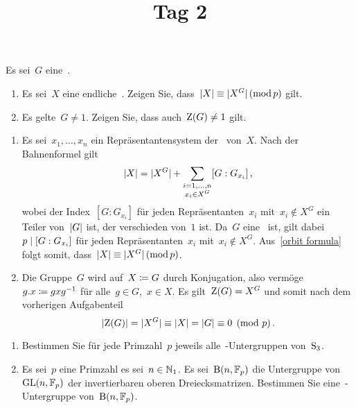 \documentclass{scrartcl}
\title{\vspace{-1em}Tag 2}
\author{}
\date{}
\begin{document}
\maketitle
\vspace{-7em}

\begin{exercise}
  Es sei~$G$ eine~.
  \begin{enumerate}
    \item
      Es sei~$X$ eine endliche~.
      Zeigen Sie, dass~$\lvert X\rvert \equiv \lvert X^G \rvert \,(\operatorname{mod} p)$ gilt.
    \item
      Es gelte~$G \neq 1$.
      Zeigen Sie, dass auch~$\operatorname{Z}(G) \neq 1$ gilt.
  \end{enumerate}
\end{exercise}

\begin{solution}
  \begin{enumerate}
    \item
      Es sei~$x_1, \dotsc, x_n$ ein Repräsentantensystem der~ von~$X$.
      Nach der Bahnenformel gilt
      \begin{equation}
        \label{orbit formula}
        \lvert X\rvert
        =
        \lvert X^ G \rvert
        +
        \sum_{\substack{ i = 1, \dotsc, n \\ x_i \in X^G }}
        [G : G_{x_i}] \,,
      \end{equation}
      wobei der Index~$[G : G_{x_i}]$ für jeden Repräsentanten~$x_i$ mit~$x_i \notin X^G$ ein Teiler von~$\lvert G\rvert$ ist, der verschieden von~$1$ ist.
      Da~$G$ eine~ ist, gilt dabei~$p \mid [G : G_{x_i}]$ für jeden Repräsentanten~$x_i$ mit~$x_i \notin X^G$.
      Aus~\eqref{orbit formula} folgt somit, dass~$\lvert X\rvert \equiv \lvert X^G\rvert \,(\operatorname{mod} p)$.
    \item
      Die Gruppe~$G$ wird auf~$X \coloneqq G$ durch Konjugation, also vermöge~$g.x \coloneqq g x g^{-1}$ für alle~$g \in G$,~$x \in X$.
      Es gilt~$\operatorname{Z}(G) = X^G$ und somit nach dem vorherigen Aufgabenteil
      \[
        \lvert\operatorname{Z}(G)\rvert
        =
        \lvert X^G\rvert
        \equiv
        \lvert X\rvert
        =
        \lvert G\rvert
        \equiv
        0
        \pmod{p} \,.
      \]
  \end{enumerate}
\end{solution}

\begin{exercise}
  \begin{enumerate}
    \item
      Bestimmen Sie für jede Primzahl~$p$ jeweils alle~-Untergruppen von~$\operatorname{S}_3$.
    \item
      Es sei~$p$ eine Primzahl es sei~$n \in \mathbb{N}_1$.
      Es sei~$\operatorname{B}(n, \mathbb{F}_p)$ die Untergruppe von~$\operatorname{GL}(n, \mathbb{F}_p)$ der invertierbaren oberen Dreiecksmatrizen.
      Bestimmen Sie eine~-Untergruppe von~$\operatorname{B}(n, \mathbb{F}_p)$.
  \end{enumerate}
\end{exercise}
\end{document}
